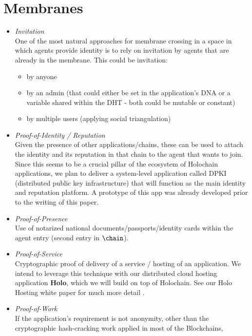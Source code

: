 \documentclass[twocolumn,showpacs,
  nofootinbib,aps,superscriptaddress,
  eqsecnum,prd,notitlepage,showkeys,10pt]{revtex4-1}
\begin{document}
\section{Membranes}
\label{apdx:membranes}

\begin{itemize}
  \item \textit{Invitation}\\
  One of the most natural approaches for membrane crossing in a space in which
  agents provide identity is to rely on invitation by agents that are already
  in the membrane. This could be invitation:
  \begin{itemize}
    \item by anyone
    \item by an admin (that could either be set in the application's DNA or a
    variable shared within the DHT - both could be mutable or constant)
    \item by multiple users (applying social triangulation)
  \end{itemize}
  \item \textit{Proof-of-Identity / Reputation}\\
  Given the presence of other applications/chains, these can be used to attach the
  identity and its reputation in that chain to the agent that wants to join.
  Since this seems to be a crucial pillar of the ecosystem of Holochain
  applications, we plan to deliver a system-level application called DPKI
  (distributed public key infrastructure) that will function as the main
  identity and reputation platform.
  A prototype of this app was already developed prior to the writing of
  this paper.
  \item \textit{Proof-of-Presence}\\
  Use of notarized national documents/passports/identity cards within the agent
  entry (second entry in $\chain$).
  \item \textit{Proof-of-Service}\\
  Cryptographic proof of delivery of a service / hosting of an application.
  We intend to leverage this technique with our distributed cloud hosting
  application \textbf{Holo}, which we will build on top of Holochain.
  See our Holo Hosting white paper for much more detail \cite{hosting-wp}.
  \item \textit{Proof-of-Work}\\
  If the application's requirement is not anonymity, other than the
  cryptographic hash-cracking work applied in most of the Blockchains,

\end{itemize}
\end{document}

